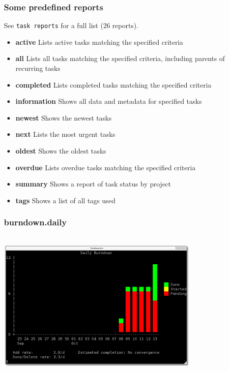 \documentclass[t,handout]{beamer}
\begin{document}
\begin{frame}
\frametitle{Some predefined reports}

See \texttt{task reports} for a full list (26 reports).

\begin{itemize}
\item \textbf{active}           Lists active tasks matching the specified criteria
\item \textbf{all}              Lists all tasks matching the specified criteria, including parents of recurring tasks
\item \textbf{completed}        Lists completed tasks matching the specified criteria
\item \textbf{information}      Shows all data and metadata for specified tasks
\item \textbf{newest}           Shows the newest tasks
\item \textbf{next}             Lists the most urgent tasks
\item \textbf{oldest}           Shows the oldest tasks
\item \textbf{overdue}          Lists overdue tasks matching the specified criteria
\item \textbf{summary}          Shows a report of task status by project
\item \textbf{tags}             Shows a list of all tags used
\end{itemize}
\end{frame}

\begin{frame}
\frametitle{burndown.daily}
\begin{center}
\includegraphics[width=10cm,height=7.5cm]{reports01.png}
\end{center}
\end{frame}
\end{document}
